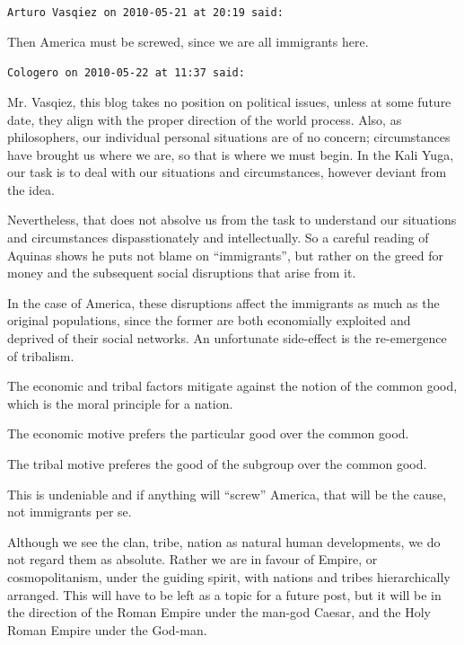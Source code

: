 \begin{footnotesize}
\begin{sffamily}
\texttt{Arturo Vasqiez on 2010-05-21 at 20:19 said:}

Then America must be screwed, since we are all immigrants here.

\hfill

\texttt{Cologero on 2010-05-22 at 11:37 said:}

Mr. Vasqiez, this blog takes no position on political issues, unless at some future date, they align with the proper direction of the world process. Also, as philosophers, our individual personal situations are of no concern; circumstances have brought us where we are, so that is where we must begin. In the Kali Yuga, our task is to deal with our situations and circumstances, however deviant from the idea.

Nevertheless, that does not absolve us from the task to understand our situations and circumstances dispasstionately and intellectually. So a careful reading of Aquinas shows he puts not blame on ``immigrants'', but rather on the greed for money and the subsequent social disruptions that arise from it.

In the case of America, these disruptions affect the immigrants as much as the original populations, since the former are both economially exploited and deprived of their social networks. An unfortunate side-effect is the re-emergence of tribalism.

The economic and tribal factors mitigate against the notion of the common good, which is the moral principle for a nation.

The economic motive prefers the particular good over the common good.

The tribal motive preferes the good of the subgroup over the common good.

This is undeniable and if anything will ``screw'' America, that will be the cause, not immigrants per se.

Although we see the clan, tribe, nation as natural human developments, we do not regard them as absolute. Rather we are in favour of Empire, or cosmopolitanism, under the guiding spirit, with nations and tribes hierarchically arranged. This will have to be left as a topic for a future post, but it will be in the direction of the Roman Empire under the man-god Caesar, and the Holy Roman Empire under the God-man.


\hfill

\end{sffamily}
\end{footnotesize}

